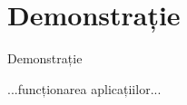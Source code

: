 \documentclass{beamer}
\begin{document}
\section{Demonstrație}
\begin{frame}{Demonstrație}
    \begin{center}
        ...funcționarea aplicațiilor...
    \end{center}
\end{frame}
\end{document}
